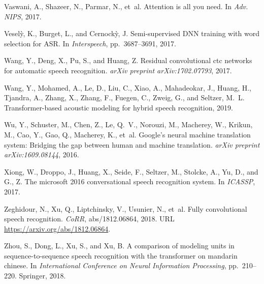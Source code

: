 \documentclass{article}
\begin{document}
\begin{thebibliography}{99}
Vaswani, A., Shazeer, N., Parmar, N., et~al.
\newblock Attention is all you need.
\newblock In \emph{Adv. NIPS}, 2017.

Vesel{\`y}, K., Burget, L., and Cernock{\`y}, J.
\newblock Semi-supervised {DNN} training with word selection for {ASR}.
\newblock In \emph{Interspeech}, pp.\  3687--3691, 2017.

Wang, Y., Deng, X., Pu, S., and Huang, Z.
\newblock Residual convolutional ctc networks for automatic speech recognition.
\newblock \emph{arXiv preprint arXiv:1702.07793}, 2017.

Wang, Y., Mohamed, A., Le, D., Liu, C., Xiao, A., Mahadeokar, J., Huang, H.,
  Tjandra, A., Zhang, X., Zhang, F., Fuegen, C., Zweig, G., and Seltzer, M.~L.
\newblock Transformer-based acoustic modeling for hybrid speech recognition,
  2019.

Wu, Y., Schuster, M., Chen, Z., Le, Q.~V., Norouzi, M., Macherey, W., Krikun,
  M., Cao, Y., Gao, Q., Macherey, K., et~al.
\newblock Google's neural machine translation system: Bridging the gap between
  human and machine translation.
\newblock \emph{arXiv preprint arXiv:1609.08144}, 2016.

Xiong, W., Droppo, J., Huang, X., Seide, F., Seltzer, M., Stolcke, A., Yu, D.,
  and G., Z.
\newblock The microsoft 2016 conversational speech recognition system.
\newblock In \emph{ICASSP}, 2017.

Zeghidour, N., Xu, Q., Liptchinsky, V., Usunier, N., et~al.
\newblock Fully convolutional speech recognition.
\newblock \emph{CoRR}, abs/1812.06864, 2018.
\newblock URL \url{https://arxiv.org/abs/1812.06864}.

Zhou, S., Dong, L., Xu, S., and Xu, B.
\newblock A comparison of modeling units in sequence-to-sequence speech
  recognition with the transformer on mandarin chinese.
\newblock In \emph{International Conference on Neural Information Processing},
  pp.\  210--220. Springer, 2018.

\end{thebibliography}
\end{document}
